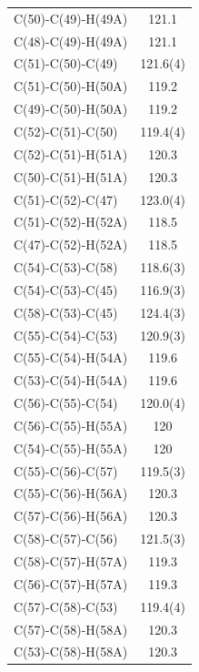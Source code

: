 \begin{center}
{\begin{supertabular}{p{1.5in}c}
C(50)-C(49)-H(49A)&121.1\\
C(48)-C(49)-H(49A)&121.1\\
C(51)-C(50)-C(49)&121.6(4)\\
C(51)-C(50)-H(50A)&119.2\\
C(49)-C(50)-H(50A)&119.2\\
C(52)-C(51)-C(50)&119.4(4)\\
C(52)-C(51)-H(51A)&120.3\\
C(50)-C(51)-H(51A)&120.3\\
C(51)-C(52)-C(47)&123.0(4)\\
C(51)-C(52)-H(52A)&118.5\\
C(47)-C(52)-H(52A)&118.5\\
C(54)-C(53)-C(58)&118.6(3)\\
C(54)-C(53)-C(45)&116.9(3)\\
C(58)-C(53)-C(45)&124.4(3)\\
C(55)-C(54)-C(53)&120.9(3)\\
C(55)-C(54)-H(54A)&119.6\\
C(53)-C(54)-H(54A)&119.6\\
C(56)-C(55)-C(54)&120.0(4)\\
C(56)-C(55)-H(55A)&120\\
C(54)-C(55)-H(55A)&120\\
C(55)-C(56)-C(57)&119.5(3)\\
C(55)-C(56)-H(56A)&120.3\\
C(57)-C(56)-H(56A)&120.3\\
C(58)-C(57)-C(56)&121.5(3)\\
C(58)-C(57)-H(57A)&119.3\\
C(56)-C(57)-H(57A)&119.3\\
C(57)-C(58)-C(53)&119.4(4)\\
C(57)-C(58)-H(58A)&120.3\\
C(53)-C(58)-H(58A)&120.3\\
\end{supertabular}
}
\end{center}

